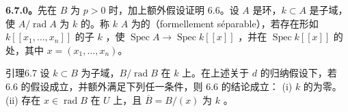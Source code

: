\textbf{6.7.0。}先在 $B$ 为 $p>0$ 时，加上额外假设证明 6.6。设 $A$ 是环，$k\subset A$ 是子域，使 $A/\operatorname{rad}A$ 为 $k$ 的。称 $k$  $A$ 为的（formellement séparable），若存在形如 $k[[x_1,\ldots,x_n]]$ 的子 $k$ ，使 $\operatorname{Spec}A\to\operatorname{Spec}k[[x]]$ ，并在 $\operatorname{Spec}k[[x]]$ 的处，其中 $x=(x_1,\ldots,x_n)$。
\begin{SGAresult}{引理}{6.7}
设 $k\subset B$ 为子域，$B/\operatorname{rad}B$ 在 $k$ 上。在上述关于 $d$ 的归纳假设下，若 6.6 的假设成立，并额外满足下列任一条件，则 6.6 的结论成立：
(i) $k$ 的为零。
(ii) 存在 $x\in\operatorname{rad}B$ 在 $U$ 上，且 $\overline B=B/(x)$ 为 $k$ 。
\end{SGAresult}
